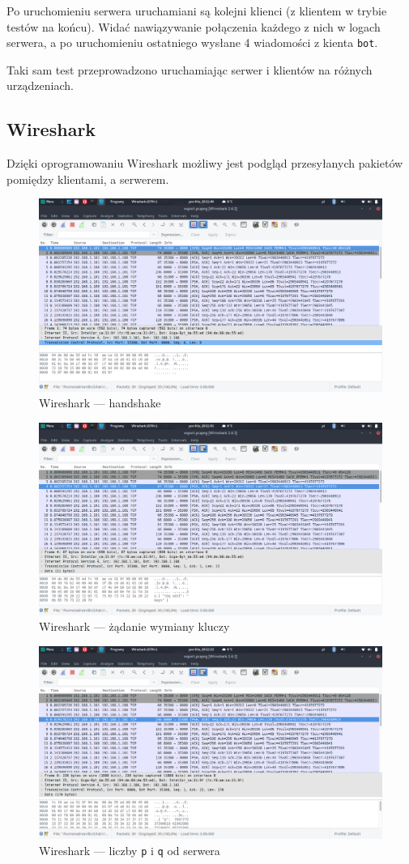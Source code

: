 \documentclass[a4paper]{article}
\begin{document}
Po uruchomieniu serwera uruchamiani są kolejni klienci (z klientem w trybie testów na końcu). Widać nawiązywanie połączenia każdego z nich w logach serwera, a po uruchomieniu ostatniego wysłane 4 wiadomości z kienta \texttt{bot}.

Taki sam test przeprowadzono uruchamiając serwer i klientów na różnych urządzeniach.

\subsection{Wireshark}
Dzięki oprogramowaniu Wireshark możliwy jest podgląd przesyłanych pakietów pomiędzy klientami, a serwerem.

\begin{figure}[H]
	\center
	\includegraphics[width=.8\textwidth]{img/1-handshake.png}
	\caption{Wireshark --- handshake}
\end{figure}

\begin{figure}[H]
	\center
\includegraphics[width=.8\textwidth]{img/2-request.png}
\caption{Wireshark --- żądanie wymiany kluczy}
\end{figure}

\begin{figure}[H]
	\center
\includegraphics[width=.8\textwidth]{img/3-pq.png}
\caption{Wireshark --- liczby \texttt{p} i \texttt{q} od serwera}
\end{figure}
\end{document}
